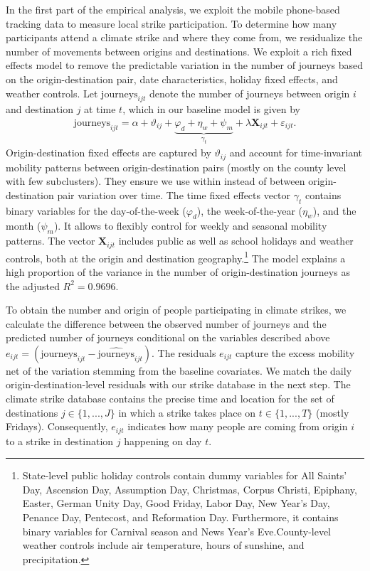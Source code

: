 In the first part of the empirical analysis, we exploit the mobile phone-based tracking data to measure local strike participation. To determine how many participants attend a climate strike and where they come from, we residualize the number of movements between origins and destinations. We exploit a rich fixed effects model to remove the predictable variation in the number of journeys based on the origin-destination pair, date characteristics, holiday fixed effects, and weather controls. Let $\text{journeys}_{ijt}$ denote the number of journeys between origin $i$ and destination $j$ at time $t$, which in our baseline model is given by 
\begin{align}
\text{journeys}_{ijt} = \alpha + \vartheta_{ij} + \underbrace{\varphi_d+\eta_w+\psi_m}_{\gamma_t} + \lambda \mathbf{X}_{ijt}  + \varepsilon_{ijt}. \label{eq_greta_cons:res_journeys}
\end{align}
Origin-destination fixed effects are captured by $\vartheta_{ij}$ and account for time-invariant mobility patterns between origin-destination pairs (mostly on the county level with few subclusters). They ensure we use within instead of between origin-destination pair variation over time. The time fixed effects vector $\gamma_t$ contains binary variables for the day-of-the-week ($\varphi_d$), the week-of-the-year ($\eta_w$), and the month ($\psi_m$). It allows to flexibly control for weekly and seasonal mobility patterns. The vector $\mathbf{X}_{ijt} $ includes public as well as school holidays and weather controls, both at the origin and destination geography.\footnote{State-level public holiday controls contain dummy variables for All Saints' Day, Ascension Day, Assumption Day, Christmas, Corpus Christi, Epiphany, Easter, German Unity Day, Good Friday, Labor Day, New Year's Day, Penance Day, Pentecost, and Reformation Day. Furthermore, it contains binary variables for Carnival season and News Year's Eve.\newline County-level weather controls include air temperature, hours of sunshine, and precipitation.} The model explains a high proportion of the variance in the number of origin-destination journeys as the adjusted $R^2=0.9696$.


To obtain the number and origin of people participating in climate strikes, we calculate the difference between the observed number of journeys and the predicted number of journeys conditional on the variables described above $e_{ijt} =(\text{journeys}_{ijt} - \widehat{\text{journeys}}_{ijt})$. The residuals $e_{ijt}$ capture the excess mobility net of the variation stemming from the baseline covariates. We match the daily origin-destination-level residuals with our strike database in the next step. The climate strike database contains the precise time and location for the set of destinations $j\in\{1,...,J\}$ in which a strike takes place on $t\in\{1,...,T\}$ (mostly Fridays). Consequently, $e_{ijt}$ indicates how many people are coming from origin $i$ to a strike in destination $j$ happening on day $t$. 


